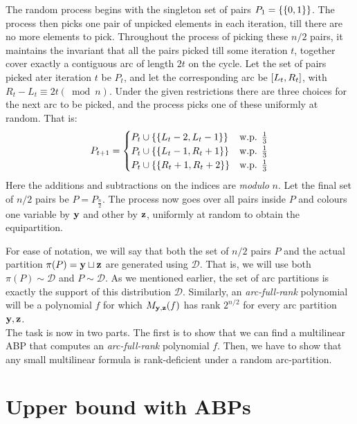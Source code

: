 \vspace{0.5em}

The random process begins with the singleton set of pairs $P_1 = \left\{\left\{0,1\right\}\right\}$. The process then picks one pair of unpicked elements in each iteration, till there are no more elements to pick. Throughout the process of picking these $n/2$ pairs, it maintains the invariant that all the pairs picked till some iteration $t$, together cover exactly a contiguous arc of length $2t$ on the cycle. Let the set of pairs picked ater iteration $t$ be $P_t$, and let the corresponding arc be $\left[L_t, R_t\right]$, with $R_t - L_t \equiv 2t (\bmod n)$. Under the given restrictions there are three choices for the next arc to be picked, and the process picks one of these uniformly at random. That is:
\[
	P_{t+1} =
	\begin{cases}
		P_t \cup \left\{\left\{L_t - 2, L_t - 1\right\}\right\} &\text{w.p. } \frac{1}{3}\\ 
		P_t \cup \left\{\left\{L_t - 1, R_t + 1\right\}\right\} &\text{w.p. } \frac{1}{3}\\
		P_t \cup \left\{\left\{R_t + 1, R_t + 2\right\}\right\} &\text{w.p. } \frac{1}{3}\\
	\end{cases}
\]
Here the additions and subtractions on the indices are \emph{modulo} $n$. Let the final set of $n/2$ pairs be $P = P_{\frac{n}{2}}$. The process now goes over all pairs inside $P$ and colours one variable by $\mathbf{y}$ and other by $\mathbf{z}$, uniformly at random to obtain the equipartition.

For ease of notation, we will say that both the set of $n/2$ pairs $P$ and the actual partition $\pi(P)=\mathbf{y} \sqcup \mathbf{z}$ are generated using $\mathcal{D}$. That is, we will use both $\pi(P) \sim \mathcal{D}$ and $P \sim \mathcal{D}$. As we mentioned earlier, the set of arc partitions is exactly the support of this distribution $\mathcal{D}$. Similarly, an \emph{arc-full-rank} polynomial will be a polynomial $f$ for which $M_{\mathbf{y},\mathbf{z}}(f)$ has rank $2^{n/2}$ for every arc partition $\mathbf{y},\mathbf{z}$.\\

The task is now in two parts. The first is to show that we can find a multilinear ABP that computes an \emph{arc-full-rank} polynomial $f$. Then, we have to show that any small multilinear formula is rank-deficient under a random arc-partition. 

\section{Upper bound with ABPs}

